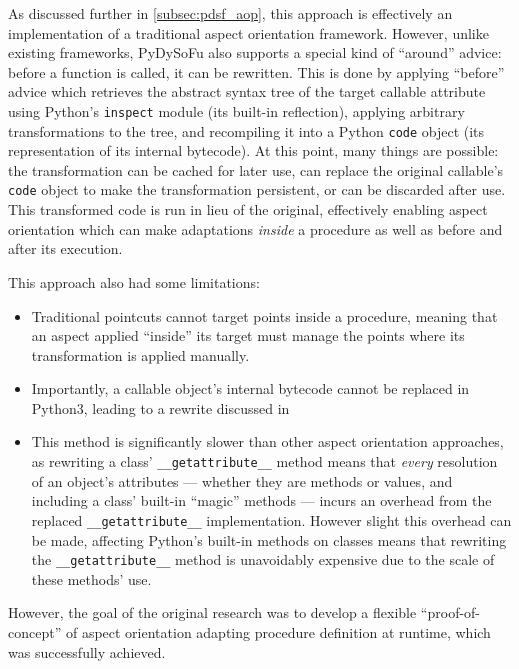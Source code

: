As discussed further in \cref{subsec:pdsf_aop}, this approach is effectively an
implementation of a traditional aspect orientation framework. However, unlike
existing frameworks, PyDySoFu also supports a special kind of ``around'' advice:
before a function is called, it can be rewritten. This is done by applying
``before'' advice which retrieves the abstract syntax tree of the target
callable attribute using Python's \lstinline{inspect} module (its built-in
reflection), applying arbitrary transformations to the tree, and recompiling it
into a Python \lstinline{code} object (its representation of its
internal bytecode). At this point, many things are possible: the transformation
can be cached for later use, can replace the original callable's
\lstinline{code} object to make the transformation persistent, or can be
discarded after use. This transformed code is run in lieu of the original,
effectively enabling aspect orientation which can make adaptations \emph{inside}
a procedure as well as before and after its execution.

This approach also had some limitations:

\begin{itemize}
    \item Traditional pointcuts cannot target points inside a procedure, meaning
    that an aspect applied ``inside'' its target must manage the points where
    its transformation is applied manually.
    \item Importantly, a callable object's internal bytecode cannot be replaced
    in Python3, leading to a rewrite discussed in 
    \item This method is significantly slower than other aspect orientation
    approaches, as rewriting a class' \lstinline{__getattribute__} method means
    that \emph{every} resolution of an object's attributes --- whether they are
    methods or values, and including a class' built-in ``magic'' methods ---
    incurs an overhead from the replaced \lstinline{__getattribute__}
    implementation. However slight this overhead can be made, affecting Python's
    built-in methods on classes means that rewriting the
    \lstinline{__getattribute__} method is unavoidably expensive due to the
    scale of these methods' use.
\end{itemize}

However, the goal of the original research was to develop a flexible
``proof-of-concept'' of aspect orientation adapting procedure definition at
runtime, which was successfully
achieved\cite{wallis2018caise,wallis2018genetic}. 

